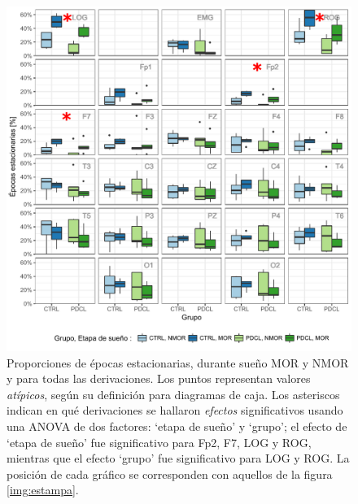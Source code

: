 \documentclass[12pt,letterpaper]{book}
\begin{document}
\begin{figure}
\centering
\includegraphics[width=\linewidth]
{./scripts_graf_res/comparacion_cabeza.pdf}
\caption{Proporciones de épocas estacionarias, durante sueño MOR y NMOR y para todas las derivaciones.
%
Los puntos representan valores \textit{atípicos}, según su definición para diagramas de caja.
%
Los asteriscos indican en qué derivaciones se hallaron \textit{efectos} significativos usando una ANOVA de dos factores: `etapa de sueño' y `grupo'; el efecto de `etapa de sueño' fue significativo para Fp2, F7, LOG y ROG, mientras que el efecto `grupo' fue significativo para LOG y ROG.
%
La posición de cada gráfico se corresponden con aquellos de la figura \ref{img:estampa}.}
\label{comparacion_verde}
\end{figure}

%
\end{document}

